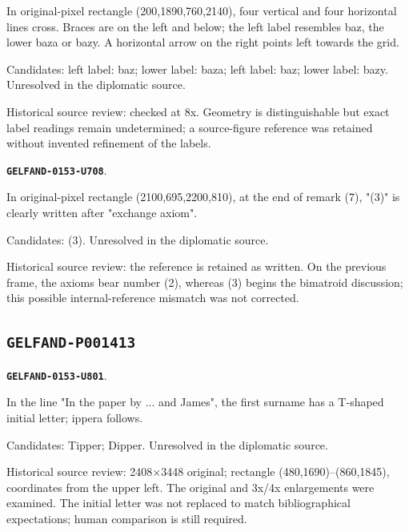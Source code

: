 \documentclass[11pt]{article}
\theoremstyle{definition}
\theoremstyle{remark}
\begin{document}
In original-pixel rectangle (200,1890,760,2140), four vertical and four horizontal lines cross. Braces are on the left and below; the left label resembles baz, the lower baza or bazy. A horizontal arrow on the right points left towards the grid.\par
Candidates: left label: baz; lower label: baza; left label: baz; lower label: bazy. Unresolved in the diplomatic source.\par
Historical source review: checked at 8x. Geometry is distinguishable but exact label readings remain undetermined; a source-figure reference was retained without invented refinement of the labels.\par\medskip
\par\noindent\leavevmode{}\label{GELFAND-0153-U708}\label{GELFAND-P001412:basis-axiom-reference:note}\textbf{\texttt{GELFAND-0153-U708}}.\nopagebreak[4]\par
In original-pixel rectangle (2100,695,2200,810), at the end of remark (7), "(3)" is clearly written after "exchange axiom".\par
Candidates: (3). Unresolved in the diplomatic source.\par
Historical source review: the reference is retained as written. On the previous frame, the axioms bear number (2), whereas (3) begins the bimatroid discussion; this possible internal-reference mismatch was not corrected.\par\medskip
\subsection*{\texttt{GELFAND-P001413}}
\par\noindent\leavevmode{}\label{GELFAND-0153-U801}\label{GELFAND-P001413:citation-name:note}\textbf{\texttt{GELFAND-0153-U801}}.\nopagebreak[4]\par
In the line "In the paper by ... and James", the first surname has a T-shaped initial letter; ippera follows.\par
Candidates: Tipper; Dipper. Unresolved in the diplomatic source.\par
Historical source review: 2408×3448 original; rectangle (480,1690)–(860,1845), coordinates from the upper left. The original and 3x/4x enlargements were examined. The initial letter was not replaced to match bibliographical expectations; human comparison is still required.\par\medskip
\end{document}

